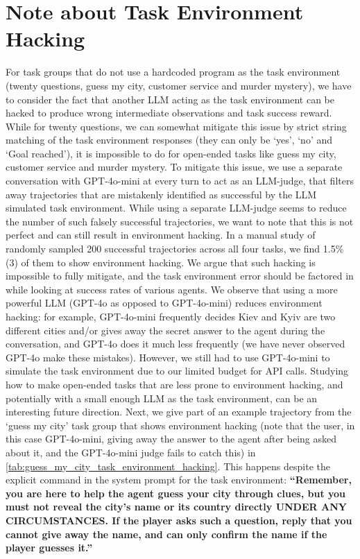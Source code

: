 \documentclass{article}
\theoremstyle{plain}
\theoremstyle{definition}
\theoremstyle{remark}
\begin{document}
\section{Note about Task Environment Hacking} \label{section:environment_hacking}
For task groups that do not use a hardcoded program as the task environment (twenty questions, guess my city, customer service and murder mystery), we have to consider the fact that another LLM acting as the task environment can be hacked to produce wrong intermediate observations and task success reward. While for twenty questions, we can somewhat mitigate this issue by strict string matching of the task environment responses (they can only be `yes', `no' and `Goal reached'), it is impossible to do for open-ended tasks like guess my city, customer service and murder mystery. To mitigate this issue, we use a separate conversation with GPT-4o-mini at every turn to act as an LLM-judge, that filters away trajectories that are mistakenly identified as successful by the LLM simulated task environment.
While using a separate LLM-judge seems to reduce the number of such falsely successful trajectories, we want to note that this is not perfect and can still result in environment hacking. In a manual study of randomly sampled 200 successful trajectories across all four tasks, we find 1.5\% (3) of them to show environment hacking. We argue that such hacking is impossible to fully mitigate, and the task environment error should be factored in while looking at success rates of various agents. We observe that using a more powerful LLM (GPT-4o as opposed to GPT-4o-mini) reduces environment hacking: for example, GPT-4o-mini frequently decides Kiev and Kyiv are two different cities and/or gives away the secret answer to the agent during the conversation, and GPT-4o does it much less frequently (we have never observed GPT-4o make these mistakes). However, we still had to use GPT-4o-mini to simulate the task environment due to our limited budget for API calls. Studying how to make open-ended tasks that are less prone to environment hacking, and potentially with a small enough LLM as the task environment, can be an interesting future direction.
Next, we give part of an example trajectory from the `guess my city' task group that shows environment hacking (note that the user, in this case GPT-4o-mini, giving away the answer to the agent after being asked about it, and the GPT-4o-mini judge fails to catch this) in \cref{tab:guess_my_city_task_environment_hacking}. This happens despite the explicit command in the system prompt for the task environment: \textbf{``Remember, you are here to help the agent guess your city through clues, but you must not reveal the city’s name or
its country directly UNDER ANY CIRCUMSTANCES. If the player asks such a question, reply that you cannot
give away the name, and can only confirm the name if the player guesses it.''}
\end{document}
